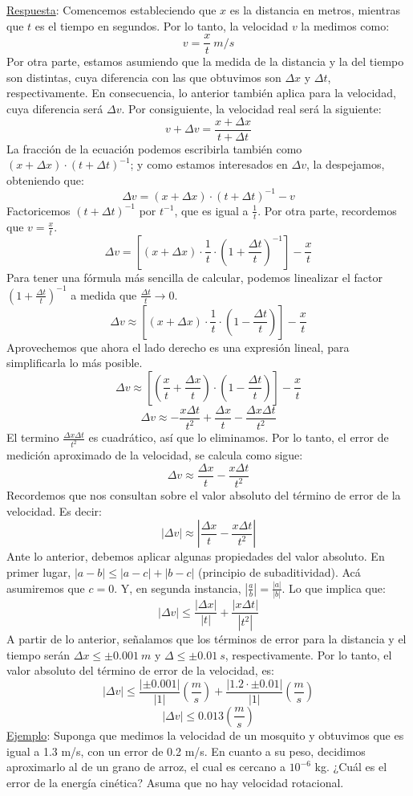 \documentclass[12pt]{article}
\begin{document}
\underline{Respuesta}:  Comencemos estableciendo que $x$ es la distancia en metros, mientras que $t$ es el tiempo en segundos. Por lo tanto, la velocidad $v$ la medimos como:
\[v = \frac{x}{t} \ m/s\]
Por otra parte, estamos asumiendo que la medida de la distancia y la del tiempo son distintas, cuya diferencia con las que obtuvimos son $\Delta x$ y $\Delta t$, respectivamente. En consecuencia, lo anterior también aplica para la velocidad, cuya diferencia será $\Delta v$. Por consiguiente, la velocidad real será la siguiente:
\[v + \Delta v = \frac{x + \Delta x}{t + \Delta t}\]
La fracción de la ecuación podemos escribirla también como $(x + \Delta x) \cdot (t + \Delta t)^{-1}$; y como estamos interesados en $\Delta v$, la despejamos, obteniendo que:
\[\Delta v = (x + \Delta x) \cdot (t + \Delta t)^{-1} - v\]
Factoricemos $(t + \Delta t)^{-1}$ por $t^{-1}$, que es igual a $\frac{1}{t}$. Por otra parte, recordemos que $v = \frac{x}{t}$.
\[\Delta v = \left[(x + \Delta x) \cdot \frac{1}{t} \cdot \left(1 + \frac{\Delta t}{t}\right)^{-1}\right] - \frac{x}{t}\]
Para tener una fórmula más sencilla de calcular, podemos linealizar el factor $\left(1 + \frac{\Delta t}{t}\right)^{-1}$ a medida que $\frac{\Delta t}{t} \to 0$.
\[\Delta v \approx \left[(x + \Delta x) \cdot \frac{1}{t} \cdot \left(1 - \frac{\Delta t}{t}\right)\right] - \frac{x}{t}\]
Aprovechemos que ahora el lado derecho es una expresión lineal, para simplificarla lo más posible.
\[\Delta v \approx \left[\left(\frac{x}{t} + \frac{\Delta x}{t}\right) \cdot \left(1 - \frac{\Delta t}{t}\right)\right] - \frac{x}{t}\]
\[\Delta v \approx - \frac{x \Delta t}{t^{2}} + \frac{\Delta x}{t} - \frac{\Delta x \Delta t}{t^{2}}\]
El termino $\frac{\Delta x \Delta t}{t^{2}}$ es cuadrático, así que lo eliminamos. Por lo tanto, el error de medición aproximado de la velocidad, se calcula como sigue:
\[\Delta v \approx \frac{\Delta x}{t} - \frac{x \Delta t}{t^{2}}\]
Recordemos que nos consultan sobre el valor absoluto del término de error de la velocidad. Es decir:
\[|\Delta v| \approx \left|\frac{\Delta x}{t} - \frac{x \Delta t}{t^{2}}\right|\]
Ante lo anterior, debemos aplicar algunas propiedades del valor absoluto. En primer lugar, $|a - b| \leq |a - c| + |b - c|$ (principio de subaditividad). Acá asumiremos que $c = 0$. Y, en segunda instancia, $\left| \frac{a}{b} \right| = \frac{|a|}{|b|}$. Lo que implica que:
\[|\Delta v| \leq \frac{|\Delta x|}{|t|} + \frac{|x \Delta t|}{|t^{2}|}\]
A partir de lo anterior, señalamos que los términos de error para la distancia y el tiempo serán $\Delta x \leq \pm 0.001 \ m$ y $\Delta \leq \pm 0.01 \ s$, respectivamente. Por lo tanto, el valor absoluto del término de error de la velocidad, es:
\[|\Delta v| \leq \frac{|\pm 0.001|}{|1|} \left(\frac{m}{s}\right) + \frac{|1.2 \cdot \pm 0.01|}{|1|} \left(\frac{m}{s}\right)\]
\[|\Delta v| \leq 0.013 \left(\frac{m}{s}\right)\]
\underline{Ejemplo}: Suponga que medimos la velocidad de un mosquito y obtuvimos que es igual a 1.3 m/s, con un error de 0.2 m/s. En cuanto a su peso, decidimos aproximarlo al de un grano de arroz, el cual es cercano a $10^{-6}$ kg. ¿Cuál es el error de la energía cinética? Asuma que no hay velocidad rotacional.
\end{document}
